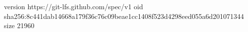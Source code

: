 version https://git-lfs.github.com/spec/v1
oid sha256:8c441dab14668a179f36c76c09beae1cc1408f523d4298eed055a6d201071344
size 21960
